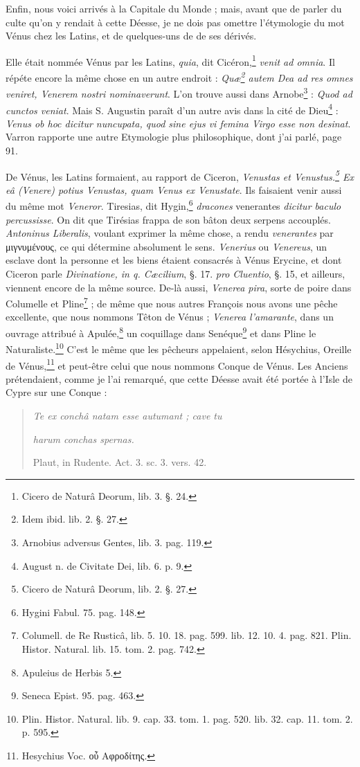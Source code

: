 \documentclass[a4paper, 18pt, oneside]{article}
\begin{document}
Enfin, nous voici arrivés à la Capitale du Monde ; mais, avant que de parler du culte qu'on y rendait à cette Déesse, je ne dois pas omettre l'étymologie du mot Vénus chez les Latins, et de quelques-uns de de ses dérivés.

Elle était nommée Vénus par les Latins, \emph{quia}, dit Cicéron,\footnote{Cicero de Naturâ Deorum, lib. 3. §. 24.} \emph{venit ad omnia}. Il répéte encore la même chose en un autre endroit : \emph{Quæ\footnote{Idem ibid. lib. 2. §. 27.} autem Dea ad res omnes veniret, Venerem nostri nominaverunt}. L'on trouve aussi dans Arnobe\footnote{Arnobius adversus Gentes, lib. 3. pag. 119.} : \emph{Quod ad cunctos veniat}. Mais S. Augustin paraît d'un autre avis dans la cité de Dieu\footnote{August n. de Civitate Dei, lib. 6. p. 9.} : \emph{Venus ob hoc dicitur nuncupata, quod sine ejus vi femina Virgo esse non desinat}. Varron rapporte une autre Etymologie plus philosophique, dont j'ai parlé, page 91.

De Vénus, les Latins formaient, au rapport de Ciceron, \emph{Venustas et Venustus.\footnote{Cicero de Naturâ Deorum, lib. 2. §. 27.} Ex eâ (Venere) potius Venustas, quam Venus ex Venustate}. Ils faisaient venir aussi du même mot \emph{Veneror}. Tiresias, dit Hygin,\footnote{Hygini Fabul. 75. pag. 148.} \emph{dracones} venerantes \emph{dicitur baculo percussisse}. On dit que Tirésias frappa de son bâton deux serpens accouplés. \emph{Antoninus Liberalis}, voulant exprimer la même chose, a rendu \emph{venerantes} par μιγνυμένους, ce qui détermine absolument le sens. \emph{Venerius} ou \emph{Venereus}, un esclave dont la personne et les biens étaient consacrés à Vénus Erycine, et dont Ciceron parle \emph{Divinatione, in q. Cæcilium}, §. 17. \emph{pro Cluentio}, §. 15, et ailleurs, viennent encore de la même source. De-là aussi, \emph{Venerea pira}, sorte de poire dans Columelle et Pline\footnote{Columell. de Re Rusticâ, lib. 5. 10. 18. pag. 599. lib. 12. 10. 4. pag. 821. Plin. Histor. Natural. lib. 15. tom. 2. pag. 742.} ; de même que nous autres François nous avons une pêche excellente, que nous nommons Têton de Vénus ; \emph{Venerea l'amarante}, dans un ouvrage attribué à Apulée,\footnote{Apuleius de Herbis 5.} un coquillage dans Senéque\footnote{Seneca Epist. 95. pag. 463.} et dans Pline le Naturaliste.\footnote{Plin. Histor. Natural. lib. 9. cap. 33. tom. 1. pag. 520. lib. 32. cap. 11. tom. 2. p. 595.} C'est le même que les pêcheurs appelaient, selon Hésychius, Oreille de Vénus,\footnote{Hesychius Voc. οὖ Αφροδίτης.} et peut-être celui que nous nommons Conque de Vénus. Les Anciens prétendaient, comme je l'ai remarqué, que cette Déesse avait été portée à l'Isle de Cypre sur une Conque :
\begin{quotation}
\emph{Te ex conchâ natam esse autumant ; cave tu}

\hspace*{5mm}\emph{harum conchas spernas.}

\hspace*{30mm}Plaut, in Rudente. Act. 3. sc. 3. vers. 42.
\end{quotation}
\end{document}
